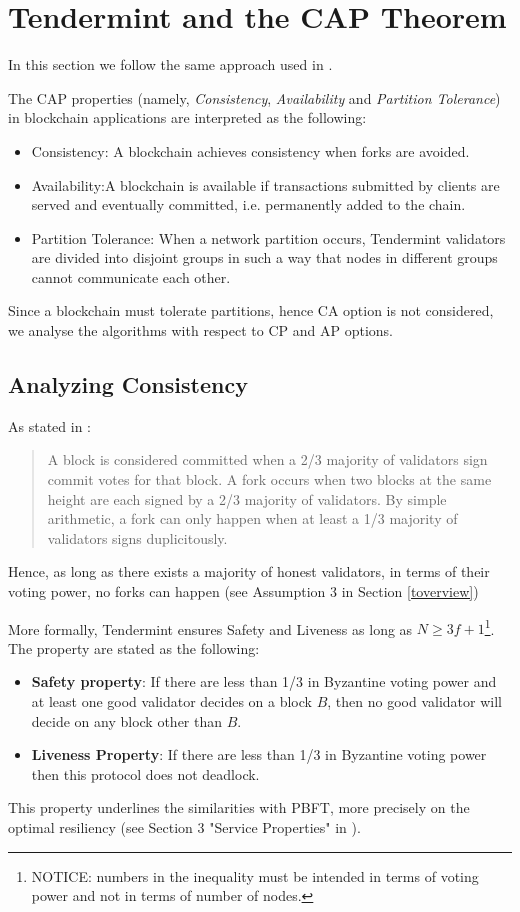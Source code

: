 \documentclass[]{article}
\begin{document}
\section{Tendermint and the CAP Theorem}
\label{tcap}
In this section we follow the same approach used in \cite{poa-vs-pbft}.

The CAP properties (namely, \textit{Consistency}, \textit{Availability} and \textit{Partition Tolerance}) in blockchain applications are interpreted as the following:
\begin{itemize}
\item Consistency: A blockchain achieves consistency when forks are avoided.
\item Availability:A blockchain is available if transactions submitted by clients are served and eventually committed, i.e. permanently added to the chain.
\item Partition Tolerance: When a network partition occurs, Tendermint validators are divided into disjoint groups in such a way that nodes in different groups cannot communicate each other.
\end{itemize}
Since a blockchain must tolerate partitions, hence CA option is not considered, we analyse the algorithms with respect to CP and AP options.

\subsection{Analyzing Consistency}
As stated in \cite{tpaper}:
\blockquote{
A block is considered committed when a 2/3 majority of validators sign commit votes for that block. A fork occurs when two blocks at the same height are each signed by a 2/3 majority of validators. By simple arithmetic, a fork can only happen when at least a 1/3 majority of validators signs duplicitously.}
Hence, as long as there exists a majority of honest validators, in terms of their voting power, no forks can happen (see Assumption 3 in Section \ref{toverview})

More formally, Tendermint ensures Safety and Liveness \cite[Section 6.3 and 6.4]{tpaper} as long as $N \ge 3f + 1$\footnote{NOTICE: numbers in the inequality must be intended in terms of voting power and not in terms of number of nodes.}.
The property are stated as the following:
\begin{itemize}
\item \textbf{Safety property}: If there are less than 1/3 in Byzantine voting power and at least one good validator decides on a block $B$, then no good validator will decide on any block other than $B$. 

\item \textbf{Liveness Property}: If there are less than 1/3 in Byzantine voting power then this protocol does not deadlock.
\end{itemize}
This property underlines the similarities with PBFT, more precisely on the optimal resiliency (see Section 3 "Service Properties" in \cite{pbft}).
\end{document}
